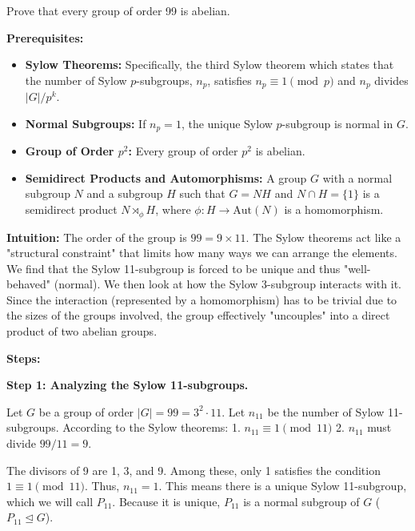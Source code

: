 \begin{exercise}
\label{algebra:2018:3}
Prove that every group of order 99 is abelian.
\end{exercise}
\begin{solution}
\textbf{Prerequisites:}
\begin{itemize}
    \item \textbf{Sylow Theorems:} Specifically, the third Sylow theorem which states that the number of Sylow $p$-subgroups, $n_p$, satisfies $n_p \equiv 1 \pmod p$ and $n_p$ divides $|G|/p^k$.
    \item \textbf{Normal Subgroups:} If $n_p = 1$, the unique Sylow $p$-subgroup is normal in $G$.
    \item \textbf{Group of Order $p^2$:} Every group of order $p^2$ is abelian.
    \item \textbf{Semidirect Products and Automorphisms:} A group $G$ with a normal subgroup $N$ and a subgroup $H$ such that $G=NH$ and $N \cap H = \{1\}$ is a semidirect product $N \rtimes_\phi H$, where $\phi: H \to \mathrm{Aut}(N)$ is a homomorphism.
\end{itemize}

\bigskip

\textbf{Intuition:}
The order of the group is $99 = 9 \times 11$. The Sylow theorems act like a "structural constraint" that limits how many ways we can arrange the elements. We find that the Sylow 11-subgroup is forced to be unique and thus "well-behaved" (normal). We then look at how the Sylow 3-subgroup interacts with it. Since the interaction (represented by a homomorphism) has to be trivial due to the sizes of the groups involved, the group effectively "uncouples" into a direct product of two abelian groups.

\bigskip

\textbf{Steps:}

\textbf{Step 1: Analyzing the Sylow 11-subgroups.}

Let $G$ be a group of order $|G| = 99 = 3^2 \cdot 11$. Let $n_{11}$ be the number of Sylow 11-subgroups. According to the Sylow theorems:
1. $n_{11} \equiv 1 \pmod{11}$
2. $n_{11}$ must divide $99/11 = 9$.

\bigskip

The divisors of 9 are 1, 3, and 9. Among these, only 1 satisfies the condition $1 \equiv 1 \pmod{11}$. Thus, $n_{11} = 1$. This means there is a unique Sylow 11-subgroup, which we will call $P_{11}$. Because it is unique, $P_{11}$ is a normal subgroup of $G$ ($P_{11} \trianglelefteq G$).


\end{solution}
